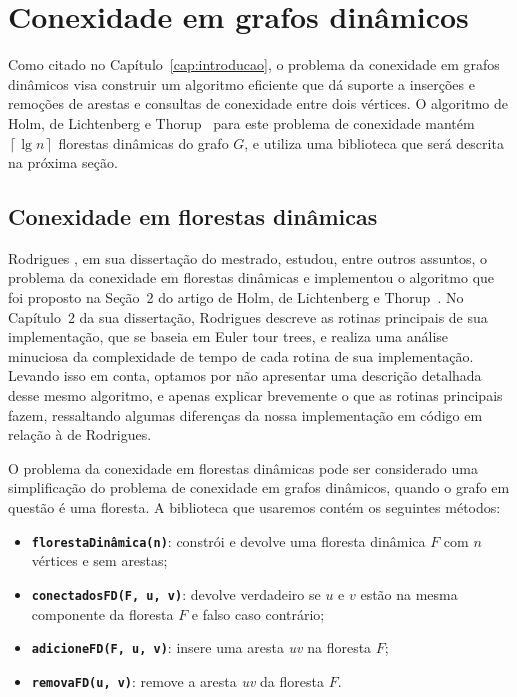 

\chapter{Conexidade em grafos dinâmicos}

\enlargethispage{.8\baselineskip}

Como citado no Capítulo~\ref{cap:introducao}, o problema da conexidade em grafos dinâmicos visa construir um algoritmo eficiente que dá suporte a inserções e remoções de arestas e consultas de conexidade entre dois vértices. O algoritmo de Holm, de Lichtenberg e Thorup~\cite{jacob_holm} para este problema de conexidade mantém $\left\lceil \lg n \right\rceil$ florestas dinâmicas do grafo $G$, e utiliza uma biblioteca que será descrita na próxima seção. 

\section{Conexidade em florestas dinâmicas}
\label{sec:dynamic-forest-connectivity}

Rodrigues \cite{arthur}, em sua dissertação do mestrado, estudou, entre outros assuntos, o problema da conexidade em florestas dinâmicas e implementou o algoritmo que foi proposto na Seção~2 do artigo de Holm, de Lichtenberg e Thorup~\cite{jacob_holm}. No Capítulo~2 da sua dissertação, Rodrigues descreve as rotinas principais de sua implementação, que se baseia em Euler tour trees, e realiza uma análise minuciosa da complexidade de tempo de cada rotina de sua implementação. Levando isso em conta, optamos por não apresentar uma descrição detalhada desse mesmo algoritmo, e apenas explicar brevemente o que as rotinas principais fazem, ressaltando algumas diferenças da nossa implementação em código em relação à de Rodrigues.  

O problema da conexidade em florestas dinâmicas pode ser considerado uma simplificação do problema de conexidade em grafos dinâmicos, quando o grafo em questão é uma floresta. A biblioteca que usaremos contém os seguintes métodos:

\begin{itemize}
    \item \texttt{\textbf{florestaDinâmica(n)}}: constrói e devolve uma floresta dinâmica $F$ com $n$ vértices e sem arestas;
    \item \texttt{\textbf{conectadosFD(F, u, v)}}: devolve verdadeiro se \textit{$u$} e \textit{$v$} estão na mesma componente da floresta $F$ e falso caso contrário;
    \item \texttt{\textbf{adicioneFD(F, u, v)}}: insere uma aresta \textit{uv} na floresta $F$;
    \item \texttt{\textbf{removaFD(u, v)}}: remove a aresta \textit{uv} da floresta $F$.
\end{itemize}


